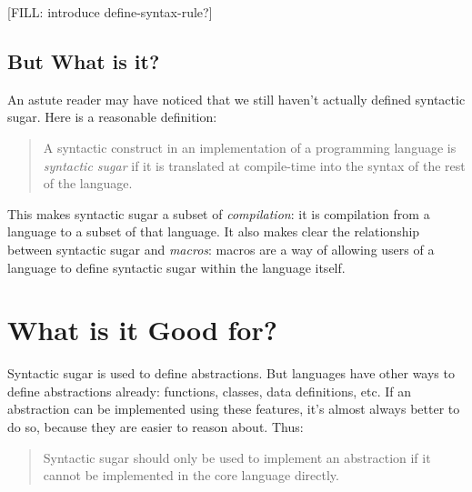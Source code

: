 [FILL: introduce define-syntax-rule?]

\subsection{But What is it?}
An astute reader may have noticed that we still haven't actually
defined syntactic sugar. Here is a reasonable definition:
\begin{quote}
  A syntactic construct in an implementation of a programming language
  is \emph{syntactic sugar} if it is translated at compile-time into
  the syntax of the rest of the language.
\end{quote}
This makes syntactic sugar a subset of \emph{compilation}: it is
compilation from a language to a subset of that language. It also
makes clear the relationship between syntactic sugar and
\emph{macros}: macros are a way of allowing users of a language to
define syntactic sugar within the language itself.


\section{What is it Good for?}

Syntactic sugar is used to define abstractions. But languages have
other ways to define abstractions already: functions, classes, data
definitions, etc. If an abstraction can be implemented using these
features, it's almost always better to do so, because they are easier
to reason about. Thus:
\begin{quote}
  Syntactic sugar should only be used to implement an abstraction if
  it cannot be implemented in the core language directly.
\end{quote}

